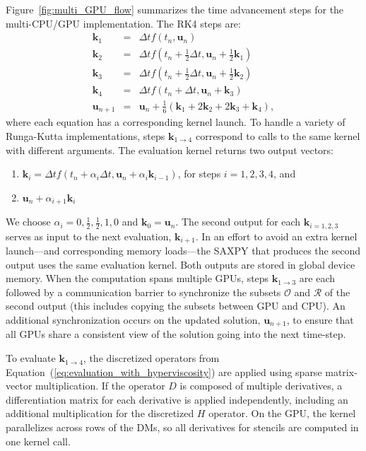 Figure~\ref{fig:multi_GPU_flow} summarizes the time advancement steps for the multi-CPU/GPU implementation. The RK4 steps are: 
\begin{eqnarray*} 
\mathbf{k}_1 &=& \Delta t f(t_n, \mathbf{u}_n) \\
\mathbf{k}_2 &=& \Delta t f(t_n+\frac{1}{2}\Delta t, \mathbf{u}_n + \frac{1}{2}\mathbf{k}_1) \\
\mathbf{k}_3 &=& \Delta t f(t_n+\frac{1}{2}\Delta t, \mathbf{u}_n + \frac{1}{2}\mathbf{k}_2) \\
\mathbf{k}_4 &=& \Delta t f(t_n+\Delta t, \mathbf{u}_n + \mathbf{k}_3) \\
\mathbf{u}_{n+1} &=& \mathbf{u}_{n} + \frac{1}{6}(\mathbf{k}_1 + 2\mathbf{k}_2 + 2\mathbf{k}_3 +\mathbf{k}_4),
\label{eqn:rk4}
\end{eqnarray*}
where each equation has a corresponding kernel launch. To handle a variety of Runga-Kutta implementations, steps $\mathbf{k}_{1\rightarrow4}$ correspond to calls to the same kernel with different arguments. The evaluation kernel returns two output vectors: 
\begin{enumerate} 
\item $\mathbf{k}_i = \Delta t f(t_n + \alpha_{i} \Delta t, \mathbf{u}_n + \alpha_{i} \mathbf{k}_{i-1})$, for steps $i=1,2,3,4$, and
\item  $\mathbf{u}_n + \alpha_{i+1} \mathbf{k}_i$
\end{enumerate} 
We choose $\alpha_{i}=0, \frac{1}{2}, \frac{1}{2}, 1, 0$ and $\mathbf{k}_{0} = \mathbf{u}_n$. The second output for each $\mathbf{k}_{i=1,2,3}$ serves as input to the next evaluation, $\mathbf{k}_{i+1}$. In an effort to avoid an extra kernel launch---and corresponding memory loads---the SAXPY that produces the second output uses the same evaluation kernel. Both outputs are stored in global device memory. When the computation spans multiple GPUs, steps $\mathbf{k}_{1\rightarrow3}$ are each followed by a communication barrier to synchronize the subsets $\mathcal{O}$ and $\mathcal{R}$ of the second output (this includes copying the subsets between GPU and CPU). An additional synchronization occurs on the updated  solution, $\mathbf{u}_{n+1}$, to ensure that all GPUs share a consistent view of the solution going into the next time-step.

To evaluate $\mathbf{k}_{1\rightarrow4}$, the discretized operators from Equation~(\ref{eq:evaluation_with_hyperviscosity}) are applied using sparse matrix-vector multiplication. If the operator $D$ is composed of multiple derivatives, a differentiation matrix for each derivative is applied independently, including an additional multiplication for the discretized $H$ operator.
 On the GPU, the kernel parallelizes across rows of the DMs, so all derivatives for stencils are computed in one kernel call.


